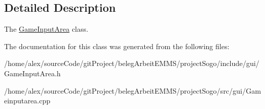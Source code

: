 \subsection{Detailed Description}
The \hyperlink{classGameInputArea}{Game\-Input\-Area} class. 

The documentation for this class was generated from the following files\-:\begin{DoxyCompactItemize}
\item 
/home/alex/source\-Code/git\-Project/beleg\-Arbeit\-E\-M\-M\-S/project\-Sogo/include/gui/Game\-Input\-Area.\-h\item 
/home/alex/source\-Code/git\-Project/beleg\-Arbeit\-E\-M\-M\-S/project\-Sogo/src/gui/Gameinputarea.\-cpp\end{DoxyCompactItemize}

